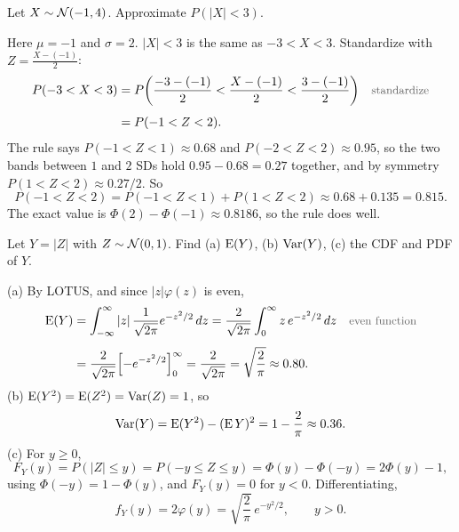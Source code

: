 \begin{example}\label{ex:normalrule}
  Let $X \sim \mathcal{N}(-1, 4)$. Approximate $P(|X| < 3)$.
\end{example}

\begin{solution}
  Here $\mu = -1$ and $\sigma = 2$. $|X| < 3$ is the same as $-3 < X < 3$. Standardize with $Z = \frac{X - (-1)}{2}$:
  \begin{align*}
    P(-3 < X < 3)
      &= P\!\left(\frac{-3 - (-1)}{2} < \frac{X - (-1)}{2} < \frac{3 - (-1)}{2}\right)
      && \by{standardize} \\[0.4em]
      &= P(-1 < Z < 2).
  \end{align*}
  The rule says $P(-1 < Z < 1) \approx 0.68$ and $P(-2 < Z < 2) \approx 0.95$, so the two bands between $1$ and $2$ SDs hold $0.95 - 0.68 = 0.27$ together, and by symmetry $P(1 < Z < 2) \approx 0.27/2$. So
  \[
    P(-1 < Z < 2) = P(-1 < Z < 1) + P(1 < Z < 2) \approx 0.68 + 0.135 = 0.815.
  \]
  The exact value is $\Phi(2) - \Phi(-1) \approx 0.8186$, so the rule does well.
\end{solution}

\begin{example}\label{ex:foldednormal}
  Let $Y = |Z|$ with $Z \sim \mathcal{N}(0, 1)$. Find (a) $\operatorname{E}(Y)$, (b) $\operatorname{Var}(Y)$, (c) the CDF and PDF of $Y$.
\end{example}

\begin{solution}
  (a) By LOTUS, and since $|z|\varphi(z)$ is even,
  \begin{align*}
    \E(Y)
      &= \int_{-\infty}^{\infty} |z|\, \frac{1}{\sqrt{2\pi}} e^{-z^{2}/2}\,dz
       = \frac{2}{\sqrt{2\pi}} \int_{0}^{\infty} z\, e^{-z^{2}/2}\,dz
      && \by{even function} \\[0.4em]
      &= \frac{2}{\sqrt{2\pi}} \Bigl[-e^{-z^{2}/2}\Bigr]_{0}^{\infty}
       = \frac{2}{\sqrt{2\pi}}
       = \sqrt{\frac{2}{\pi}} \approx 0.80.
  \end{align*}
  (b) $\operatorname{E}(Y^{2}) = \operatorname{E}(Z^{2}) = \operatorname{Var}(Z) = 1$, so
  \[
    \operatorname{Var}(Y) = \operatorname{E}(Y^{2}) - (\operatorname{E} Y)^{2} = 1 - \frac{2}{\pi} \approx 0.36.
  \]
  (c) For $y \ge 0$,
  \[
    F_Y(y) = P(|Z| \le y) = P(-y \le Z \le y) = \Phi(y) - \Phi(-y) = 2\Phi(y) - 1,
  \]
  using $\Phi(-y) = 1 - \Phi(y)$, and $F_Y(y) = 0$ for $y < 0$. Differentiating,
  \[
    f_Y(y) = 2\varphi(y) = \sqrt{\frac{2}{\pi}}\, e^{-y^{2}/2}, \qquad y > 0.
  \]
\end{solution}

